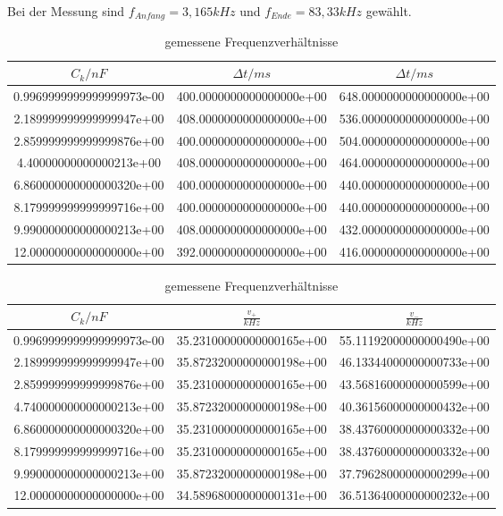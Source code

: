 Bei der Messung sind $f_{Anfang} = 3,165kHz$ und $f_{Ende} = 83,33kHz$ gewählt.

\begin{table}
  \centering
\caption{gemessene Frequenzverhältnisse}
\label{tab:sweep}
\begin{tabular}{S S S}
  \toprule
  {$C_k/nF$} & {$\Delta t/ms$} & {$\Delta t/ms$}\\
  \midrule
  0.9969999999999999973e-00 & 400.0000000000000000e+00 & 648.0000000000000000e+00\\
  2.189999999999999947e+00 & 408.0000000000000000e+00 & 536.0000000000000000e+00\\
  2.859999999999999876e+00 & 400.0000000000000000e+00 & 504.0000000000000000e+00\\
  4.40000000000000213e+00 & 408.0000000000000000e+00 & 464.0000000000000000e+00\\
  6.860000000000000320e+00 & 400.0000000000000000e+00 & 440.0000000000000000e+00\\
  8.179999999999999716e+00 & 400.0000000000000000e+00 & 440.0000000000000000e+00\\
  9.990000000000000213e+00 & 408.0000000000000000e+00 & 432.0000000000000000e+00\\
  12.00000000000000000e+00 & 392.0000000000000000e+00 & 416.0000000000000000e+00\\
\bottomrule
\end{tabular}
\end{table}
\FloatBarrier

\begin{table}
  \centering
\caption{gemessene Frequenzverhältnisse}
\label{tab:sweap}
\begin{tabular}{S S S}
  \toprule
  {$C_k/nF$} & {$\frac{v_+}{kHz}$} & {$\frac{v_-}{kHz}$}\\
  \midrule
  0.9969999999999999973e-00 & 35.23100000000000165e+00 & 55.11192000000000490e+00\\
  2.189999999999999947e+00 & 35.87232000000000198e+00 & 46.13344000000000733e+00\\
  2.859999999999999876e+00 & 35.23100000000000165e+00 & 43.56816000000000599e+00\\
  4.740000000000000213e+00 & 35.87232000000000198e+00 & 40.36156000000000432e+00\\
  6.860000000000000320e+00 & 35.23100000000000165e+00 & 38.43760000000000332e+00\\
  8.179999999999999716e+00 & 35.23100000000000165e+00 & 38.43760000000000332e+00\\
  9.990000000000000213e+00 & 35.87232000000000198e+00 & 37.79628000000000299e+00\\
  12.00000000000000000e+00 & 34.58968000000000131e+00 & 36.51364000000000232e+00\\

\bottomrule
\end{tabular}
\end{table}
\FloatBarrier


